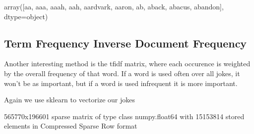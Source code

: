 \documentclass[letterpaper,10pt,english]{jupyterBook}
\begin{document}
\begin{sphinxVerbatim}[commandchars=\\\{\}]
\PYG{p}{[}\PYG{p}{]}
\end{sphinxVerbatim}

\begin{sphinxVerbatim}[commandchars=\\\{\}]
array([\PYGZsq{}aa\PYGZsq{}, \PYGZsq{}aaa\PYGZsq{}, \PYGZsq{}aaah\PYGZsq{}, \PYGZsq{}aah\PYGZsq{}, \PYGZsq{}aardvark\PYGZsq{}, \PYGZsq{}aaron\PYGZsq{}, \PYGZsq{}ab\PYGZsq{}, \PYGZsq{}aback\PYGZsq{},
       \PYGZsq{}abacus\PYGZsq{}, \PYGZsq{}abandon\PYGZsq{}], dtype=object)
\end{sphinxVerbatim}


\subsection{Term Frequency \sphinxhyphen{} Inverse Document Frequency}
\label{\detokenize{c7_case_studies/Jokes:term-frequency-inverse-document-frequency}}
\sphinxAtStartPar
Another interesting method is the tf\sphinxhyphen{}idf matrix, where each occurence is weighted by the overall frequency of that word. If a word is used often over all jokes, it won’t be as important, but if a word is used infrequent it is more important.

\sphinxAtStartPar
Again we use sklearn to vectorize our jokes

\begin{sphinxVerbatim}[commandchars=\\\{\}]
   
  
  
\end{sphinxVerbatim}

\begin{sphinxVerbatim}[commandchars=\\\{\}]
\PYGZlt{}565770x196601 sparse matrix of type \PYGZsq{}\PYGZlt{}class \PYGZsq{}numpy.float64\PYGZsq{}\PYGZgt{}\PYGZsq{}
	with 15153814 stored elements in Compressed Sparse Row format\PYGZgt{}
\end{sphinxVerbatim}
\end{document}
